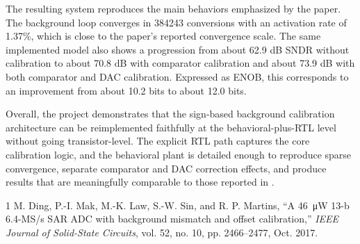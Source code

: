 \documentclass[11pt]{article}
\begin{document}
The resulting system reproduces the main behaviors emphasized by the paper. The background loop converges in 384243 conversions with an activation rate of 1.37\%, which is close to the paper's reported convergence scale. The same implemented model also shows a progression from about 62.9 dB SNDR without calibration to about 70.8 dB with comparator calibration and about 73.9 dB with both comparator and DAC calibration. Expressed as ENOB, this corresponds to an improvement from about 10.2 bits to about 12.0 bits.

Overall, the project demonstrates that the sign-based background calibration architecture can be reimplemented faithfully at the behavioral-plus-RTL level without going transistor-level. The explicit RTL path captures the core calibration logic, and the behavioral plant is detailed enough to reproduce sparse convergence, separate comparator and DAC correction effects, and produce results that are meaningfully comparable to those reported in \cite{ding2017}.

\begin{thebibliography}{1}
M. Ding, P.-I. Mak, M.-K. Law, S.-W. Sin, and R. P. Martins, ``A 46~\si{\micro\watt} 13-b 6.4-MS/s SAR ADC with background mismatch and offset calibration,'' \emph{IEEE Journal of Solid-State Circuits}, vol. 52, no. 10, pp. 2466--2477, Oct. 2017.
\end{thebibliography}
\end{document}
